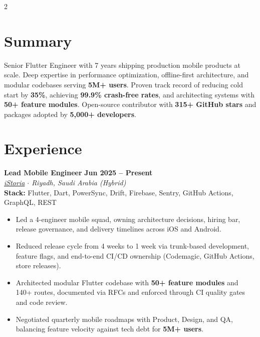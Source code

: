 \documentclass[10pt,a4paper]{article}
\newcommand{\workexp}[5]{
    \noindent \textbf{#1} \hfill \textbf{#2} \\
    \textit{#3} \\
    {\small\color{techstack}\textbf{Stack:} #4}
    \vspace{0pt}
    \begin{itemize}[noitemsep,topsep=0pt,leftmargin=1.5em]
    #5
    \end{itemize}
    \vspace{1pt}
}
\begin{document}
\begin{paracol}{2}
        \section{Summary}\label{sec:summary}
        Senior Flutter Engineer with 7 years shipping production mobile products at scale. Deep expertise in performance optimization, offline-first architecture, and modular codebases serving \textbf{5M+ users}. Proven track record of reducing cold start by \textbf{35\%}, achieving \textbf{99.9\% crash-free rates}, and architecting systems with \textbf{50+ feature modules}. Open-source contributor with \textbf{315+ GitHub stars} and packages adopted by \textbf{5,000+ developers}.


        \section{Experience}\label{sec:experience}

        \workexp{Lead Mobile Engineer}{Jun 2025 -- Present}
        {\href{https://istoria.app/en/}{iStoria} $\cdot$ Riyadh, Saudi Arabia (Hybrid)}
        {Flutter, Dart, PowerSync, Drift, Firebase, Sentry, GitHub Actions, GraphQL, REST}
        {
            \item Led a 4-engineer mobile squad, owning architecture decisions, hiring bar, release governance, and delivery timelines across iOS and Android.
        \item Reduced release cycle from 4 weeks to 1 week via trunk-based development, feature flags, and end-to-end CI/CD ownership (Codemagic, GitHub Actions, store releases).
        \item Architected modular Flutter codebase with \textbf{50+ feature modules} and 140+ routes, documented via RFCs and enforced through CI quality gates and code review.
        \item Negotiated quarterly mobile roadmaps with Product, Design, and QA, balancing feature velocity against tech debt for \textbf{5M+ users}.
        }


\end{paracol}
\end{document}
